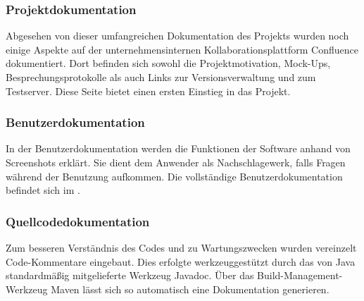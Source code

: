 \subsubsection{Projektdokumentation}\label{sec:Projektdokumentation}
Abgesehen von dieser umfangreichen Dokumentation des Projekts wurden noch einige Aspekte auf der unternehmensinternen Kollaborationsplattform Confluence dokumentiert. Dort befinden sich sowohl die Projektmotivation, Mock-Ups, Besprechungsprotokolle als auch Links zur Versionsverwaltung und zum Testserver. Diese Seite bietet einen ersten Einstieg in das Projekt.

\subsubsection{Benutzerdokumentation}\label{sec:Benutzerdokumentation}
In der Benutzerdokumentation werden die Funktionen der Software anhand von Screenshots erklärt. Sie dient dem Anwender als Nachschlagewerk, falls Fragen während der Benutzung aufkommen. Die vollständige Benutzerdokumentation befindet sich im .

\subsubsection{Quellcodedokumentation}\label{sec:Quellcodedokumentation}
Zum besseren Verständnis des Codes und zu Wartungszwecken wurden vereinzelt Code-Kom\-men\-tare eingebaut. Dies erfolgte werkzeuggestützt durch das von Java standardmäßig mitgelieferte Werkzeug Javadoc. Über das Build-Management-Werkzeug Maven lässt sich so automatisch eine Dokumentation generieren.

